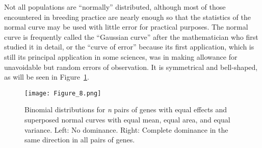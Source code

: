 {
Not all populations are ``normally'' distributed, although most of
those encountered in breeding practice are nearly enough so that the
statistics of the normal curve may be used with little error for practical
purposes. The normal curve is frequently called the ``Gaussian curve''
after the mathematician who first studied it in detail, or the ``curve of
error'' because its first application, which is still its principal application
in some sciences, was in making allowance for unavoidable but
random errors of observation. It is symmetrical and bell-shaped, as will
be seen in Figure~\ref{fig:Lush_Figure_8}.

\begin{figure}
    \texttt{[image: Figure\_8.png]}
    \caption{Binomial distributions for \textit{n} pairs of genes with equal effects
    		 and superposed normal curves with equal mean, equal area, and equal
    		 variance. Left: No dominance. Right: Complete dominance in the same
    		 direction in all pairs of genes.}
    \label{fig:Lush_Figure_8}
\end{figure}

}
